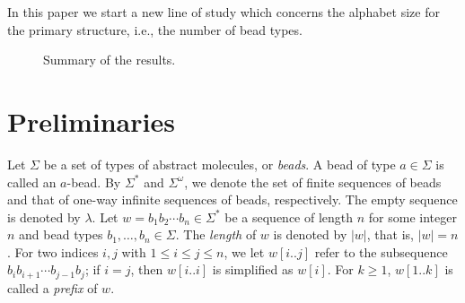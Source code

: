 \documentclass[runningheads]{llncs}
\begin{document}


In this paper we start a new line of study which concerns the alphabet size for the primary structure, i.e., the number of bead types.

\begin{figure}[tb]
\caption{Summary of the results.}
\label{fig:summary}
\end{figure}

	\section{Preliminaries}
Let $\Sigma$ be a set of types of abstract molecules, or \textit{beads}. 
A bead of type $a \in \Sigma$ is called an $a$-bead. 
By $\Sigma^*$ and $\Sigma^\omega$, we denote the set of finite sequences of beads and that of one-way infinite sequences of beads, respectively. 
The empty sequence is denoted by $\lambda$. 
Let $w = b_1 b_2 \cdots b_n \in \Sigma^*$ be a sequence of length $n$ for some integer $n$ and bead types $b_1, \ldots, b_n \in \Sigma$. 
The \textit{length} of $w$ is denoted by $|w|$, that is, $|w| = n$. 
For two indices $i, j$ with $1 \le i \le j \le n$, we let $w[i..j]$ refer to the subsequence $b_i b_{i+1} \cdots b_{j-1}b_j$; if $i = j$, then $w[i..i]$ is simplified as $w[i]$. 
For $k \ge 1$, $w[1..k]$ is called a \textit{prefix} of $w$. 
\end{document}

